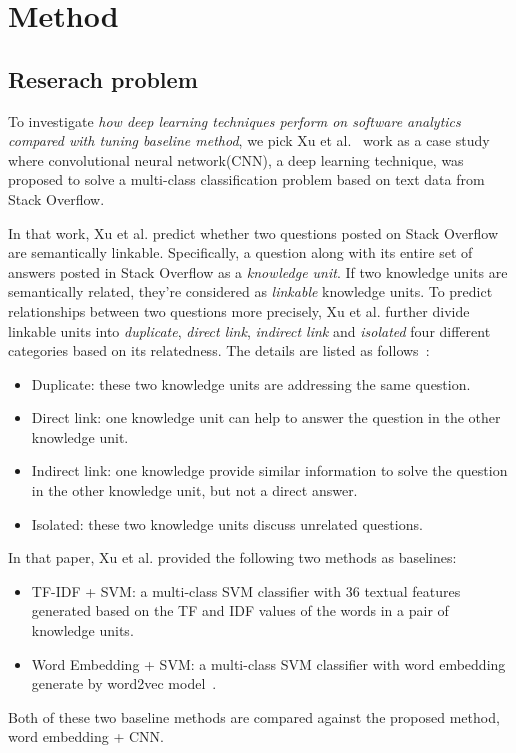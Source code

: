 \documentclass[sigconf,review, anonymous]{acmart}
\theoremstyle{break}
\begin{document}
\section{Method}

\subsection{Reserach problem}\label{problem}
To investigate {\it how deep learning techniques perform on software analytics compared 
with tuning baseline method}, we pick Xu et al.~\cite{xu2016predicting} work as a case study
where convolutional neural network(CNN), a deep learning technique, was proposed to 
solve a multi-class classification problem based on text data from Stack Overflow.

In that work, Xu et al. predict whether two questions posted on Stack Overflow are semantically linkable. 
Specifically,  a question along with its entire set of answers posted in Stack Overflow
as a {\it knowledge unit}. If two knowledge units are semantically related, they're considered
as {\it linkable} knowledge units. To predict relationships between two questions more precisely, 
Xu et al. further divide linkable  units 
into {\it duplicate}, {\it direct link}, {\it indirect link} and {\it isolated}  four different categories 
based on its relatedness. The details are listed as follows~\cite{xu2016predicting}:

\begin{itemize}
\item Duplicate:  these two knowledge units are addressing the same question.
\item Direct link: one knowledge unit can help to answer the question in the other knowledge unit.
\item Indirect link: one knowledge provide similar information to solve the question in the other knowledge unit, but not a direct answer.
\item Isolated: these two knowledge units discuss unrelated questions.
\end{itemize}

In that paper, Xu et al. provided the following two methods as baselines:

\begin{itemize}
\item TF-IDF + SVM: a multi-class SVM classifier with  36 textual features generated  based on the 
TF and IDF values of the words in a pair of knowledge units. 
\item Word Embedding + SVM:  a multi-class SVM classifier with word embedding generate by word2vec model~\cite{mikolov2013distributed}.
\end{itemize}
Both of these two baseline methods are compared against the proposed method, word embedding + CNN. 
\end{document}
